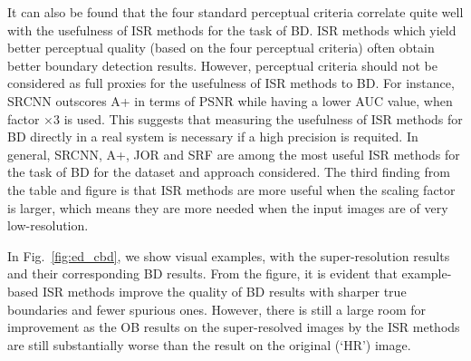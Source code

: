 \documentclass[10pt,twocolumn,letterpaper]{article}
\begin{document}
It can also be found that the four standard perceptual criteria
correlate quite well with the usefulness of ISR methods for the task
of BD. ISR methods which yield better perceptual quality (based on the
four perceptual criteria) often obtain better boundary detection
results.  However, perceptual criteria should not be considered as full proxies for the
 usefulness of ISR methods to BD. For
instance, SRCNN outscores A+ in terms of PSNR while having a lower AUC
value, when factor $\times$3 is used. This suggests that measuring the
usefulness of ISR methods for BD directly in a real system is
necessary if a high precision is requited. In general, SRCNN, A+, JOR and SRF are 
among the most useful ISR methods for the task of BD for
the dataset and approach considered. The third finding from the table
and figure is that ISR methods are more useful when the scaling factor
is larger, which means they are more needed when the input images
are of very low-resolution.

In Fig.~\ref{fig:ed_cbd}, we show visual examples, with the
super-resolution results and their corresponding BD results. From the
figure, it is evident that example-based ISR methods improve the
quality of BD results with sharper true boundaries and fewer spurious
ones. However, there is still a large room for improvement as the OB
results on the super-resolved images by the ISR methods are still
substantially worse than the result on the original (`HR') image.


\end{document}
